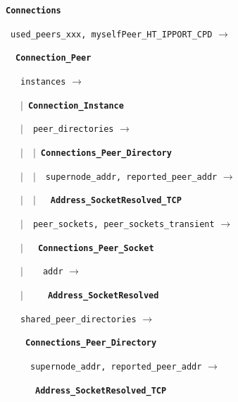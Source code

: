 \documentclass{book}
\newcommand{\cls}[1]{{\tt\bf #1}}
\newcommand{\mmb}[1]{{\tt #1}}
\begin{document}
\noindent
\strut\cls{Connections}\\
\strut~\mmb{used\_peers\_xxx,  myselfPeer\_HT\_IPPORT\_CPD} $\rightarrow$\\
\strut~~\cls{Connection\_Peer}\\
\strut~~~\mmb{instances}  $\rightarrow$\\
\strut~~~$|$~\cls{Connection\_Instance}\\
\strut~~~$|$~~\mmb{peer\_directories}  $\rightarrow$\\
\strut~~~$|$~~$|$~\cls{Connections\_Peer\_Directory}  \\
\strut~~~$|$~~$|$~~\mmb{supernode\_addr, reported\_peer\_addr}  $\rightarrow$\\
\strut~~~$|$~~$|$~~~\cls{Address\_SocketResolved\_TCP} \\	
\strut~~~$|$~~\mmb{peer\_sockets, peer\_sockets\_transient}  $\rightarrow$\\
\strut~~~$|$~~~\cls{Connections\_Peer\_Socket}\\
\strut~~~$|$~~~~\mmb{addr}  $\rightarrow$\\
\strut~~~$|$~~~~~\cls{Address\_SocketResolved}\\	
\strut~~~\mmb{shared\_peer\_directories}  $\rightarrow$\\
\strut~~~~\cls{Connections\_Peer\_Directory}  \\
\strut~~~~~\mmb{supernode\_addr, reported\_peer\_addr}  $\rightarrow$\\
\strut~~~~~~\cls{Address\_SocketResolved\_TCP} \\	
\end{document}
